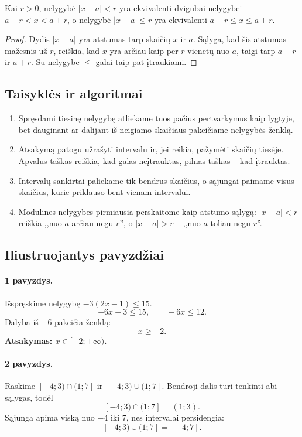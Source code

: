 \begin{teorema}
Kai $r>0$, nelygybė $|x-a|<r$ yra ekvivalenti dvigubai nelygybei $a-r<x<a+r$, o nelygybė $|x-a|\le r$ yra ekvivalenti $a-r\le x\le a+r$.
\end{teorema}
\begin{proof}
Dydis $|x-a|$ yra atstumas tarp skaičių $x$ ir $a$. Sąlyga, kad šis atstumas mažesnis už $r$, reiškia, kad $x$ yra arčiau kaip per $r$ vienetų nuo $a$, taigi tarp $a-r$ ir $a+r$. Su nelygybe $\le$ galai taip pat įtraukiami.
\end{proof}

\subsection{Taisyklės ir algoritmai}

\begin{enumerate}
\item Spręsdami tiesinę nelygybę atliekame tuos pačius pertvarkymus kaip lygtyje, bet dauginant ar dalijant iš neigiamo skaičiaus pakeičiame nelygybės ženklą.
\item Atsakymą patogu užrašyti intervalu ir, jei reikia, pažymėti skaičių tiesėje. Apvalus taškas reiškia, kad galas neįtrauktas, pilnas taškas -- kad įtrauktas.
\item Intervalų sankirtai paliekame tik bendrus skaičius, o sąjungai paimame visus skaičius, kurie priklauso bent vienam intervalui.
\item Modulines nelygybes pirmiausia perskaitome kaip atstumo sąlygą: $|x-a|<r$ reiškia ,,nuo $a$ arčiau negu $r$'', o $|x-a|>r$ -- ,,nuo $a$ toliau negu $r$''.
\end{enumerate}

\subsection{Iliustruojantys pavyzdžiai}

\paragraph{1 pavyzdys.}
Išspręskime nelygybę $-3(2x-1)\le 15$.
\[
-6x+3\le 15,\qquad -6x\le 12.
\]
Dalyba iš $-6$ pakeičia ženklą:
\[
x\ge -2.
\]
\textbf{Atsakymas: $x\in[-2;+\infty)$.}

\paragraph{2 pavyzdys.}
Raskime $[-4;3)\cap(1;7]$ ir $[-4;3)\cup(1;7]$.
Bendroji dalis turi tenkinti abi sąlygas, todėl
\[
[-4;3)\cap(1;7]=(1;3).
\]
Sąjunga apima viską nuo $-4$ iki $7$, nes intervalai persidengia:
\[
[-4;3)\cup(1;7]=[-4;7].
\]

